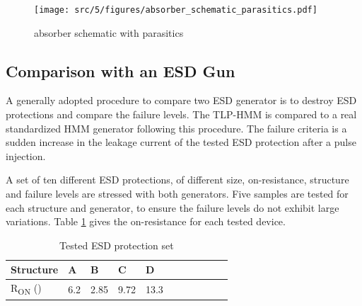 \begin{figure}[!h]
  \centering
  \texttt{[image: src/5/figures/absorber\_schematic\_parasitics.pdf]}
  \caption{absorber schematic with parasitics}
  \label{fig:absorber_schematic_parasitics}
\end{figure}




\subsection{Comparison with an ESD Gun}

A generally adopted procedure to compare two ESD generator is to destroy ESD protections and compare the failure levels.
The TLP-HMM is compared to a real standardized HMM generator following this procedure.
The failure criteria is a sudden increase in the leakage current of the tested ESD protection after a pulse injection.

A set of ten different ESD protections, of different size, on-resistance, structure and failure levels are stressed with both generators.
Five samples are tested for each structure and generator, to ensure the failure levels do not exhibit large variations.
Table \ref{tab:esd-protections} gives the on-resistance for each tested device.

\begin{table}[!h]
\centering
\begin{tabular}{@{}lllllllllll@{}}
\toprule
Structure                          & A    & B    & C     & D    \\ \midrule
R\textsubscript{ON} (\textOmega{}) & 6.2  & 2.85 & 9.72  & 13.3 \\
\end{tabular}
\caption{Tested ESD protection set}
\label{tab:esd-protections}
\end{table}

